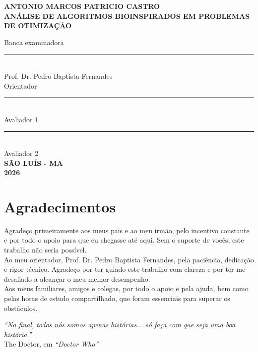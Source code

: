 \documentclass[12pt, a4paper, oneside]{report}
\begin{document}
\begin{titlepage}
    \centering
    \textbf{ANTONIO MARCOS PATRICIO CASTRO}\\[3cm]
    
    \textbf{\large ANÁLISE DE ALGORITMOS BIOINSPIRADOS EM PROBLEMAS DE OTIMIZAÇÃO}\\[2cm]
    
    \vspace{1.5cm}
    
    Banca examinadora\\[1.5cm]
    
    \rule{10cm}{0.1mm}\\
    Prof. Dr. Pedro Baptista Fernandes \\
    Orientador\\[1cm]
    \rule{10cm}{0.1mm}\\
    Avaliador 1\\[1cm]
    \rule{10cm}{0.1mm}\\
    Avaliador 2\\[1.5cm]
    
    \vfill
    \textbf{SÃO LUÍS - MA}\\
    \textbf{2026}
\end{titlepage}

\chapter*{Agradecimentos}
Agradeço primeiramente aos meus pais e ao meu irmão, pelo incentivo constante e por todo o apoio para que eu chegasse até aqui. Sem o suporte de vocês, este trabalho não seria possível. \\

Ao meu orientador, Prof. Dr. Pedro Baptista Fernandes, pela paciência, dedicação e rigor técnico. Agradeço por ter guiado este trabalho com clareza e por ter me desafiado a alcançar o meu melhor desempenho.\\

Aos meus familiares, amigos e colegas, por todo o apoio e pela ajuda, bem como pelas horas de estudo compartilhado, que foram essenciais para superar os obstáculos.
\clearpage

\vspace*{15cm}
\begin{flushright}
    \textit{``No final, todos nós somos apenas histórias... só faça com que seja uma boa história.''}\\
    \vspace{0.5cm}
    The Doctor, em \textit{``Doctor Who''}
\end{flushright}
\clearpage
\end{document}
